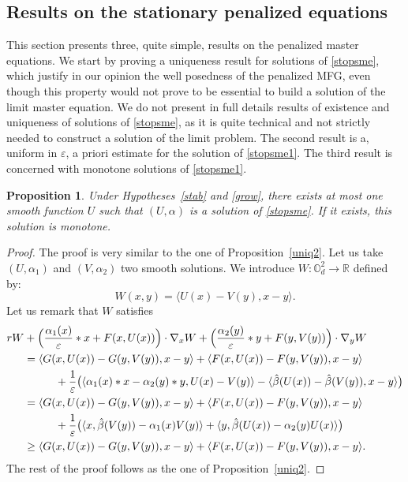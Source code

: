 \documentclass[JEP,XML,SOM,Unicode,NoEqCountersInSection,published]{cedram}
\let\epsilon\varepsilon
\newtheorem{Prop}{Proposition}[section]
\theoremstyle{definition}
\begin{document}
\subsection{Results on the stationary penalized equations}
This section presents three, quite simple, results on the penalized master equations. We start by proving a uniqueness result for solutions of \eqref{stopsme}, which justify in our opinion the well posedness of the penalized MFG, even though this property would not prove to be essential to build a solution of the limit master equation. We do not present in full details results of existence and uniqueness of solutions of \eqref{stopsme}, as it is quite technical and not strictly needed to construct a solution of the limit problem. The second result is a, uniform in $\epsilon$, a priori estimate for the solution of \eqref{stopsme1}. The third result is concerned with monotone solutions of \eqref{stopsme1}.
\begin{Prop}
Under Hypotheses~\ref{stab} and \ref{grow}, there exists at most one smooth function $U$ such that $(U,\alpha)$ is a solution of \eqref{stopsme}. If it exists, this solution is monotone.
\end{Prop}
\begin{proof}
The proof is very similar to the one of Proposition~\ref{uniq2}. Let us take $(U,\alpha_1)$ and $(V,\alpha_2)$ two smooth solutions. We introduce $W: \mathbb{O}_d^2 \to \mathbb{R}$ defined by:
\begin{equation*}
W(x,y) = \langle U(x)-V(y), x- y\rangle.
\end{equation*}
Let us remark that $W$ satisfies
\begin{equation*}
\begin{aligned}
r W&+\Bigl(\frac{\alpha_1(x)}{\epsilon} *x+F(x,U(x))\Bigr)\cdot \nabla_x W+\Bigl(\frac{\alpha_2(y)}{\epsilon}*y+F(y,V(y))\Bigr)\cdot \nabla_y W\\
&=\langle G(x,U(x))-G(y,V(y)),x-y\rangle+\langle F(x,U(x))-F(y,V(y)), x-y\rangle\\
&\hspace*{1cm}+ \frac{1}{\epsilon} \bigl(\langle \alpha_1(x)*x-\alpha_2(y)*y, U(x)-V(y)\rangle-\langle \hat{\beta}(U(x))-\hat{\beta}(V(y)), x-y \rangle \bigr)\\
&= \langle G(x,U(x))-G(y,V(y)),x-y\rangle+\langle F(x,U(x))-F(y,V(y)), x-y\rangle\\
&\hspace*{1cm}+ \frac{1}{\epsilon} \bigl(\langle x, \hat{\beta}(V(y))-\alpha_1(x)V(y)\rangle+\langle y, \hat{\beta}(U(x))-\alpha_2(y)U(x)\rangle \bigr)\\
&\geq \langle G(x,U(x))-G(y,V(y)),x-y\rangle+\langle F(x,U(x))-F(y,V(y)), x-y\rangle.
\end{aligned}
\end{equation*}
The rest of the proof follows as the one of Proposition~\ref{uniq2}.
\end{proof}
\end{document}
